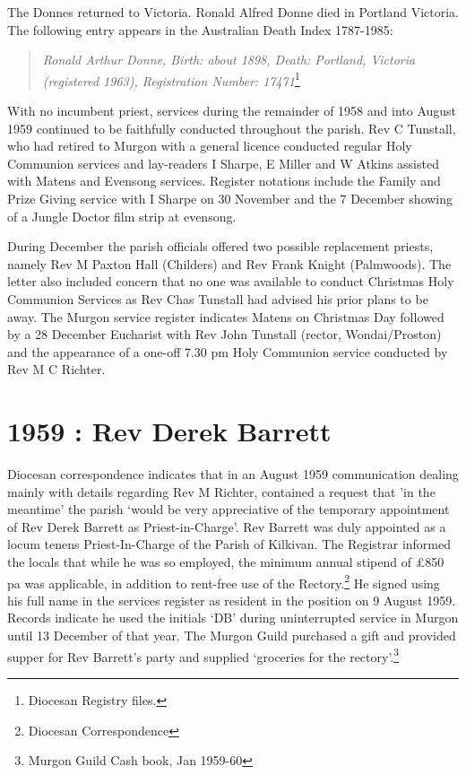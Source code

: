 The Donnes returned to Victoria. Ronald Alfred Donne died in Portland Victoria. The following entry appears in the Australian Death Index 1787-1985:

\begin{quote}
\emph{Ronald Arthur Donne, Birth: about 1898, Death: Portland, Victoria (registered 1963), Registration Number: 17471}\footnote{Diocesan Registry files.}
\end{quote}

With no incumbent priest, services during the remainder of 1958 and into August 1959 continued to be faithfully conducted throughout the parish. Rev C Tunstall, who had retired to Murgon with a general licence conducted regular Holy Communion services and lay-readers I Sharpe, E Miller and W Atkins assisted with Matens and Evensong services. Register notations include the Family and Prize Giving service with I Sharpe on 30 November and the 7 December showing of a Jungle Doctor film strip at evensong.

During December the parish officials offered two possible replacement priests, namely Rev M Paxton Hall (Childers) and Rev Frank Knight (Palmwoods). The letter also included concern that no one was available to conduct Christmas Holy Communion Services as Rev Chas Tunstall had advised his prior plans to be away. The Murgon service register indicates Matens on Christmas Day followed by a 28 December Eucharist with Rev John Tunstall (rector, Wondai/Proston) and the appearance of a one-off 7.30 pm Holy Communion service conducted by Rev M C Richter.

\hypertarget{rev-derek-barrett}{%
\section{1959 : Rev Derek Barrett}\label{rev-derek-barrett}}

Diocesan correspondence indicates that in an August 1959 communication dealing mainly with details regarding Rev M Richter, contained a request that 'in the meantime' the parish `would be very appreciative of the temporary appointment of Rev Derek Barrett as Priest-in-Charge'. Rev Barrett was duly appointed as a locum tenens Priest-In-Charge of the Parish of Kilkivan. The Registrar informed the locals that while he was so employed, the minimum annual stipend of £850 pa was applicable, in addition to rent-free use of the Rectory.\footnote{Diocesan Correspondence} He signed using his full name in the services register as resident in the position on 9 August 1959. Records indicate he used the initials `DB' during uninterrupted service in Murgon until 13 December of that year. The Murgon Guild purchased a gift and provided supper for Rev Barrett's party and supplied `groceries for the rectory'.\footnote{Murgon Guild Cash book, Jan 1959-60}

